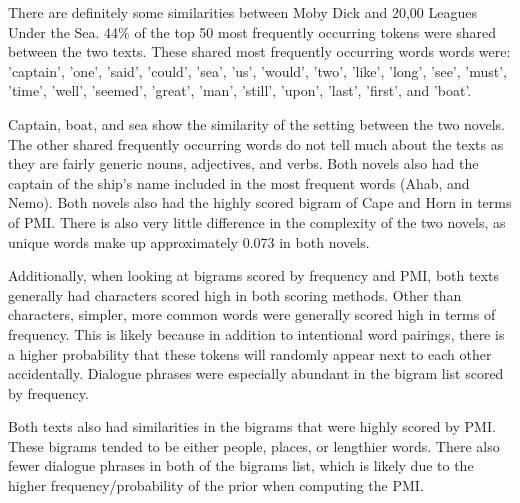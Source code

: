 \documentclass[11pt]{article}
\begin{document}
There are definitely some similarities between Moby Dick and 20,00
Leagues Under the Sea. 44\% of the top 50 most frequently occurring
tokens were shared between the two texts. These shared most frequently
occurring words words were: 'captain', 'one', 'said', 'could', 'sea',
'us', 'would', 'two', 'like', 'long', 'see', 'must', 'time', 'well',
'seemed', 'great', 'man', 'still', 'upon', 'last', 'first', and 'boat'.

Captain, boat, and sea show the similarity of the setting between the
two novels. The other shared frequently occurring words do not tell much
about the texts as they are fairly generic nouns, adjectives, and verbs.
Both novels also had the captain of the ship's name included in the most
frequent words (Ahab, and Nemo). Both novels also had the highly scored
bigram of Cape and Horn in terms of PMI. There is also very little
difference in the complexity of the two novels, as unique words make up
approximately 0.073 in both novels.

Additionally, when looking at bigrams scored by frequency and PMI, both
texts generally had characters scored high in both scoring methods.
Other than characters, simpler, more common words were generally scored
high in terms of frequency. This is likely because in addition to
intentional word pairings, there is a higher probability that these
tokens will randomly appear next to each other accidentally. Dialogue
phrases were especially abundant in the bigram list scored by frequency.

Both texts also had similarities in the bigrams that were highly scored
by PMI. These bigrams tended to be either people, places, or lengthier
words. There also fewer dialogue phrases in both of the bigrams list,
which is likely due to the higher frequency/probability of the prior
when computing the PMI.
\end{document}
